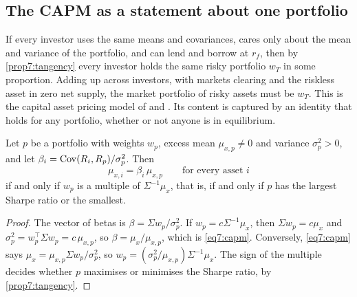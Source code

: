 \begin{chapterrefs}
\FloatBarrier
\section{The CAPM as a statement about one portfolio}
\label{sec7:capm}

If every investor uses the same means and covariances, cares only about the mean and variance of
the portfolio, and can lend and borrow at $r_f$, then by
\cref{prop7:tangency} every investor holds the same risky portfolio $w_T$ in some proportion. Adding
up across investors, with markets clearing and the riskless asset in zero net supply, the market
portfolio of risky assets must be $w_T$. This is the capital asset
pricing model of \textcite{sharpe1964} and \textcite{lintner1965}. Its content is captured by an
identity that holds for any portfolio, whether or not anyone is in equilibrium.

\begin{proposition}\label{prop7:capm}
Let $p$ be a portfolio with weights $w_p$, excess mean $\mu_{x,p}\ne0$ and variance $\sigma_p^2>0$, and
let $\beta_i=\operatorname{Cov}(R_i,R_p)/\sigma_p^2$. Then
\begin{equation}\label{eq7:capm}
  \mu_{x,i}=\beta_i\,\mu_{x,p}\qquad\text{for every asset } i
\end{equation}
if and only if $w_p$ is a multiple of $\Sigma^{-1}\mu_x$, that is, if and only if $p$ has the largest
Sharpe ratio or the smallest.
\end{proposition}

\begin{proof}
The vector of betas is $\beta=\Sigma w_p/\sigma_p^2$. If $w_p=c\Sigma^{-1}\mu_x$, then $\Sigma w_p=c\mu_x$
and $\sigma_p^2=w_p^\top\Sigma w_p=c\,\mu_{x,p}$, so $\beta=\mu_x/\mu_{x,p}$, which is \cref{eq7:capm}.
Conversely, \cref{eq7:capm} says $\mu_x=\mu_{x,p}\Sigma w_p/\sigma_p^2$, so
$w_p=(\sigma_p^2/\mu_{x,p})\Sigma^{-1}\mu_x$. The sign of the multiple decides whether $p$ maximises or
minimises the Sharpe ratio, by \cref{prop7:tangency}.
\end{proof}


\end{chapterrefs}
